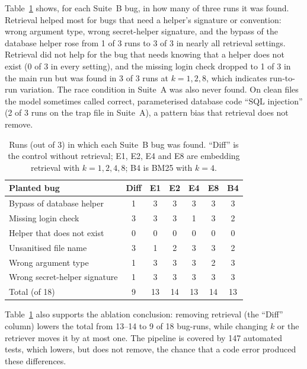 \documentclass[12pt,onecolumn,draftclsnofoot]{IEEEtran}
\begin{document}
Table~\ref{tab:perbug} shows, for each Suite~B bug, in how many of three runs it was found. Retrieval helped most for bugs that need a helper's signature or convention: wrong argument type, wrong secret-helper signature, and the bypass of the database helper rose from 1 of 3 runs to 3 of 3 in nearly all retrieval settings. Retrieval did not help for the bug that needs knowing that a helper does not exist (0 of 3 in every setting), and the missing login check dropped to 1 of 3 in the main run but was found in 3 of 3 runs at $k=1,2,8$, which indicates run-to-run variation. The race condition in Suite~A was also never found. On clean files the model sometimes called correct, parameterised database code ``SQL injection'' (2 of 3 runs on the trap file in Suite~A), a pattern bias that retrieval does not remove.

\begin{table}[!t]
\caption{Runs (out of 3) in which each Suite~B bug was found. ``Diff'' is the control without retrieval; E1, E2, E4 and E8 are embedding retrieval with $k=1,2,4,8$; B4 is BM25 with $k=4$.}\label{tab:perbug}
\centering\small
\begin{tabular}{@{}lcccccc@{}}
\toprule
Planted bug & Diff & E1 & E2 & E4 & E8 & B4 \\
\midrule
Bypass of database helper & 1 & 3 & 3 & 3 & 3 & 3 \\
Missing login check & 3 & 3 & 3 & 1 & 3 & 2 \\
Helper that does not exist & 0 & 0 & 0 & 0 & 0 & 0 \\
Unsanitised file name & 3 & 1 & 2 & 3 & 3 & 2 \\
Wrong argument type & 1 & 3 & 3 & 3 & 2 & 3 \\
Wrong secret-helper signature & 1 & 3 & 3 & 3 & 3 & 3 \\
\midrule
Total (of 18) & 9 & 13 & 14 & 13 & 14 & 13 \\
\bottomrule
\end{tabular}
\end{table}

Table~\ref{tab:perbug} also supports the ablation conclusion: removing retrieval (the ``Diff'' column) lowers the total from 13--14 to 9 of 18 bug-runs, while changing $k$ or the retriever moves it by at most one. The pipeline is covered by 147 automated tests, which lowers, but does not remove, the chance that a code error produced these differences.
\end{document}
